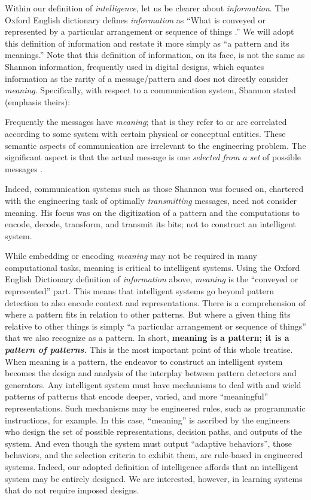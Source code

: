 Within our definition of \emph{intelligence}, let us be clearer about \emph{information}.
The Oxford English dictionary defines \emph{information} as ``What is conveyed or represented by a particular arrangement or sequence of things \cite{oxforduniversitypressInformation2021}.''
We will adopt this definition of information and restate it more simply as ``a pattern and its meanings.''
Note that this definition of information, on its face, is not the same as Shannon information, frequently used in digital designs, which equates information as the rarity of a message/pattern and does not directly consider \emph{meaning}. 
Specifically, with respect to a communication system, Shannon stated (emphasis theirs):
\begin{displayquote}
Frequently the messages have \emph{meaning}; that is they refer to or are correlated according to some system with certain physical or conceptual entities. These semantic aspects of communication are irrelevant to the engineering problem. The significant aspect is that the actual message is one \emph{selected from a set} of possible messages \cite{shannonMathematicalTheoryCommunication1948}.
\end{displayquote}
Indeed, communication systems such as those Shannon was focused on, chartered with the engineering task of optimally \emph{transmitting} messages, need not consider meaning.
His focus was on the digitization of a pattern and the computations to encode, decode, transform, and transmit its bits; not to construct an intelligent system.

While embedding or encoding \emph{meaning} may not be required in many computational tasks, meaning is critical to intelligent systems.
Using the Oxford English Dictionary definition of \emph{information} above, \emph{meaning} is the ``conveyed or represented'' part.
This means that intelligent systems go beyond pattern detection to also encode context and representations.
There is a comprehension of where a pattern fits in relation to other patterns.
But where a given thing fits relative to other things is simply ``a particular arrangement or sequence of things'' that we also recognize as a pattern.
In short, \textbf{meaning is a pattern; it is a \emph{pattern of patterns.}}
This is the most important point of this whole treatise.
When meaning is a pattern, the endeavor to construct an intelligent system becomes the design and analysis of the interplay between pattern detectors and generators.
Any intelligent system must have mechanisms to deal with and wield patterns of patterns that encode deeper, varied, and more ``meaningful'' representations.
Such mechanisms may be engineered rules, such as programmatic instructions, for example.
In this case, ``meaning'' is ascribed by the engineers who design the set of possible representations, decision paths, and outputs of the system.
And even though the system must output ``adaptive behaviors'', those behaviors, and the selection criteria to exhibit them, are rule-based in engineered systems.
Indeed, our adopted definition of intelligence affords that an intelligent system may be entirely designed.
We are interested, however, in learning systems that do not require imposed designs.

